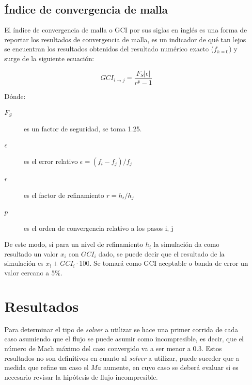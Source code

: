 \documentclass[11pt]{article}
\begin{document}
\subsection{Índice de convergencia de malla}
%
El índice de convergencia de malla o GCI por sus siglas en inglés es una forma
de reportar los resultados de convergencia de malla, es un indicador de qué tan
lejos se encuentran los resultados obtenidos del resultado numérico exacto
($f_{h=0}$) y surge de la siguiente ecuación:

\begin{equation} \label{eq:gci}
GCI_{i \rightarrow j} = \frac{F_S |\epsilon|}{r^p - 1}
\end{equation}

Dónde:
\begin{description}
    \item[$F_S$] es un factor de seguridad, se toma 1.25.
    \item[$\epsilon$] es el error relativo $\epsilon = (f_i - f_j) / f_j$
    \item[$r$] es el factor de refinamiento $r = h_i/h_j$
    \item[$p$] es el orden de convergencia relativo a los pasos i, j
\end{description}

De este modo, si para un nivel de refinamiento $h_i$ la simulación da como
resultado un valor $x_i$ con $GCI_i$ dado, se puede decir que el resultado
de la simulación es $x_i \pm GCI_i \cdot 100$.
%
Se tomará como GCI aceptable o banda de error un valor cercano a 5\%.

\section{Resultados}

Para determinar el tipo de \emph{solver} a utilizar se hace una primer corrida
de cada caso asumiendo que el flujo se puede asumir como incompresible, es
decir, que el número de Mach máximo del caso convergido va a ser menor a 0.3.
%
Estos resultados no son definitivos en cuanto al \emph{solver} a utilizar,
puede suceder que a medida que refine un caso el $Ma$ aumente, en cuyo caso
se deberá evaluar si es necesario revisar la hipótesis de flujo incompresible.

\end{document}

